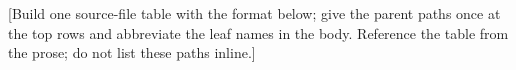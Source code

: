 [Build one source-file table with the format below; give the parent paths once at
the top rows and abbreviate the leaf names in the body. Reference the table from
the prose; do not list these paths inline.]

